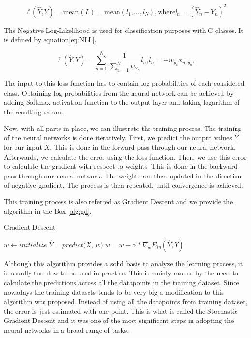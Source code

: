 \begin{equation}
    \ell(\hat{Y}, Y) = \text{mean}(L) = \text{mean}(l_1,\dots,l_N), 
    \text{where} l_n = (\hat{Y}_n - Y_n)^2
    \label{eq:MSE}
\end{equation}

The Negative Log-Likelihood is used for classification purposes with C classes.
It is defined by equation\ref{eq:NLL}.

\begin{equation}
    \ell(\hat{Y}, Y) = \sum_{n=1}^N \frac{1}{\sum_{n=1}^N w_{Y_n}} l_n,
    l_n = - w_{y_n} x_{n,y_n},
    \label{eq:NLL}
\end{equation}

The input to this loss function has to contain log-probabilities of each considered class.
Obtaining log-probabilities from the neural network can be achieved by adding Softmax activation function to the output layer and taking logarithm of the resulting values.

Now, with all parts in place, we can illustrate the training process.
The training of the neural networks is done iteratively.
First, we predict the output values $\hat{Y}$ for our input $X$.
This is done in the forward pass through our neural network.
Afterwards, we calculate the error using the loss function.
Then, we use this error to calculate the gradient with respect to weights.
This is done in the backward pass through our neural network.
The weights are then updated in the direction of negative gradient.
The process is then repeated, until convergence is achieved.

This training process is also referred as Gradient Descent and we provide the algorithm in the Box \ref{alg:gd}.

\begin{algorithm}
\caption{Gradient Descent}
\label{alg:gd}
\begin{algorithmic}[1]
\State $w \gets \textit{initialize}$
\Repeat
\State $\hat{Y} = \textit{predict(X, w)}$
\State $w = w - \alpha * \nabla_w E_{in}(\hat{Y}, Y)$
\end{algorithmic}
\end{algorithm}

Although this algorithm provides a solid basis to analyze the learning process, it is usually too slow to be used in practice.
This is mainly caused by the need to calculate the predictions across all the datapoints in the training dataset.
Since nowadays the training datasets tends to be very big a modification to this algorithm was proposed.
Instead of using all the datapoints from training dataset, the error is just estimated with one point.
This is what is called the Stochastic Gradient Descent and it was one of the most significant steps in adopting the neural networks in a broad range of tasks.

